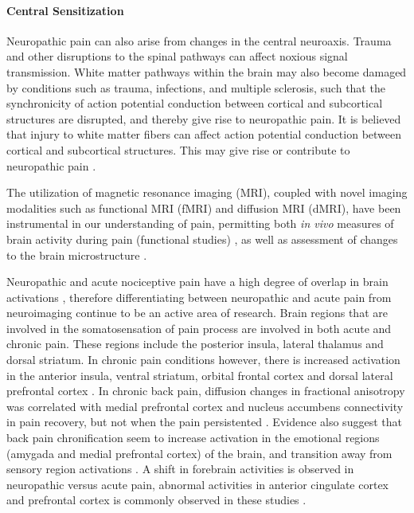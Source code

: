 \paragraph{Central Sensitization}

Neuropathic pain can also arise from changes in the central neuroaxis. Trauma and other disruptions to the spinal pathways can affect noxious signal transmission. White matter pathways within the brain may also become damaged by conditions such as trauma, infections, and multiple sclerosis, such that the synchronicity of action potential conduction between cortical and subcortical structures are disrupted, and thereby give rise to neuropathic pain. It is believed that injury to white matter fibers can affect action potential conduction between cortical and subcortical structures. This may give rise or contribute to neuropathic pain \cite{Geha2008}.

 The utilization of magnetic resonance imaging (MRI), coupled with novel imaging modalities such as functional MRI (fMRI) and diffusion MRI (dMRI), have been instrumental in our understanding of pain, permitting both \textit{in vivo} measures of brain activity during pain (functional studies) \cite{Davis2006}, as well as assessment of changes to the brain microstructure \cite{Hodaie2009a,Chen2015c}.
 
 Neuropathic and acute nociceptive pain have a high degree of overlap in brain activations \cite{Moisset2007}, therefore differentiating between neuropathic and acute pain from neuroimaging continue to be an active area of research. Brain regions that are involved in the somatosensation of pain process are involved in both acute and chronic pain. These regions include the posterior insula, lateral thalamus and dorsal striatum. In chronic pain conditions however, there is increased activation in the anterior insula, ventral striatum, orbital frontal cortex and dorsal lateral prefrontal cortex \cite{Lorenz2005}. In chronic back pain, diffusion changes in fractional anisotropy was correlated with medial prefrontal cortex and nucleus accumbens connectivity in pain recovery, but not when the pain persistented \cite{Mansour2013}. Evidence also suggest that back pain chronification seem to increase activation in the emotional regions (amygada and medial prefrontal cortex) of the brain, and transition away from sensory region activations \cite{Hashmi2013}. A shift in forebrain activities is observed in neuropathic versus acute pain, abnormal activities in anterior cingulate cortex and prefrontal cortex is commonly observed in these studies \cite{Davis2006}. 
 
